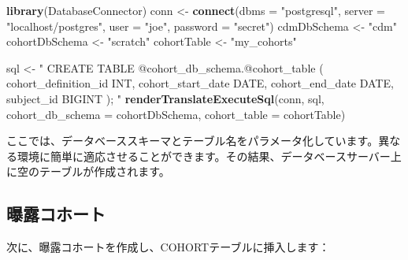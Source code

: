 \documentclass[
  11pt]{book}
\newenvironment{Shaded}{\begin{snugshade}}{\end{snugshade}}
\newcommand{\AttributeTok}[1]{\textcolor[rgb]{0.13,0.29,0.53}{#1}}
\newcommand{\FunctionTok}[1]{\textcolor[rgb]{0.13,0.29,0.53}{\textbf{#1}}}
\newcommand{\NormalTok}[1]{#1}
\newcommand{\OtherTok}[1]{\textcolor[rgb]{0.56,0.35,0.01}{#1}}
\newcommand{\StringTok}[1]{\textcolor[rgb]{0.31,0.60,0.02}{#1}}
\theoremstyle{definition}
\theoremstyle{definition}
\theoremstyle{definition}
\theoremstyle{definition}
\theoremstyle{remark}
\begin{document}
\begin{Shaded}
\begin{Highlighting}[]
\FunctionTok{library}\NormalTok{(DatabaseConnector)}
\NormalTok{conn }\OtherTok{\textless{}{-}} \FunctionTok{connect}\NormalTok{(}\AttributeTok{dbms =} \StringTok{"postgresql"}\NormalTok{,}
                \AttributeTok{server =} \StringTok{"localhost/postgres"}\NormalTok{,}
                \AttributeTok{user =} \StringTok{"joe"}\NormalTok{,}
                \AttributeTok{password =} \StringTok{"secret"}\NormalTok{)}
\NormalTok{cdmDbSchema }\OtherTok{\textless{}{-}} \StringTok{"cdm"}
\NormalTok{cohortDbSchema }\OtherTok{\textless{}{-}} \StringTok{"scratch"}
\NormalTok{cohortTable }\OtherTok{\textless{}{-}} \StringTok{"my\_cohorts"}

\NormalTok{sql }\OtherTok{\textless{}{-}} \StringTok{"}
\StringTok{CREATE TABLE @cohort\_db\_schema.@cohort\_table (}
\StringTok{  cohort\_definition\_id INT,}
\StringTok{  cohort\_start\_date DATE,}
\StringTok{  cohort\_end\_date DATE,}
\StringTok{  subject\_id BIGINT}
\StringTok{);}
\StringTok{"}
\FunctionTok{renderTranslateExecuteSql}\NormalTok{(conn, sql,}
                          \AttributeTok{cohort\_db\_schema =}\NormalTok{ cohortDbSchema,}
                          \AttributeTok{cohort\_table =}\NormalTok{ cohortTable)}
\end{Highlighting}
\end{Shaded}

ここでは、データベーススキーマとテーブル名をパラメータ化しています。異なる環境に簡単に適応させることができます。その結果、データベースサーバー上に空のテーブルが作成されます。

\subsection{曝露コホート}\label{ux66ddux9732ux30b3ux30dbux30fcux30c8}

次に、曝露コホートを作成し、COHORTテーブルに挿入します：
\end{document}
